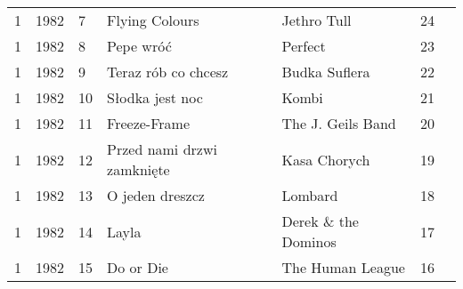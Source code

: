 \documentclass[11pt]{article}
\begin{document}
\begin{tabular}{r|llllll}
	 1                                       & 1982                                    &  7                                      & Flying Colours                          & Jethro Tull                             & 24                                     \\
	 1                                       & 1982                                    &  8                                      & Pepe wróć                               & Perfect                                 & 23                                     \\
	 1                                       & 1982                                    &  9                                      & Teraz rób co chcesz                     & Budka Suflera                           & 22                                     \\
	 1                                       & 1982                                    & 10                                      & Słodka jest noc                         & Kombi                                   & 21                                     \\
	 1                                       & 1982                                    & 11                                      & Freeze-Frame                            & The J. Geils Band                       & 20                                     \\
	 1                                       & 1982                                    & 12                                      & Przed nami drzwi zamknięte              & Kasa Chorych                            & 19                                     \\
	 1                                       & 1982                                    & 13                                      & O jeden dreszcz                         & Lombard                                 & 18                                     \\
	 1                                       & 1982                                    & 14                                      & Layla                                   & Derek \& the Dominos                   & 17                                     \\
	 1                                       & 1982                                    & 15                                      & Do or Die                               & The Human League                        & 16                                     \\
\end{tabular}
\end{document}

